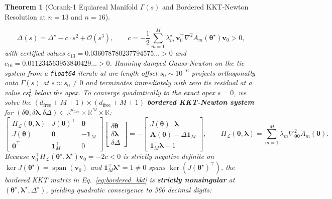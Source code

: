 \documentclass[11pt,a4paper]{article}
\newtheorem{theorem}{Theorem}
\begin{document}
\begin{theorem}[Corank-1 Equiareal Manifold $\Gamma(s)$ and Bordered KKT-Newton Resolution at $n=13$ and $n=16$]
\begin{enumerate}
\begin{equation}
\Delta(s) = \Delta^\star - c \cdot s^2 + \mathcal{O}(s^3), \qquad c = -\frac{1}{2}\sum_{m=1}^M \lambda_m^\star \,\mathbf{v}_0^\top \nabla^2 A_m(\boldsymbol{\theta}^\star)\mathbf{v}_0 > 0,
\tag{18}\label{eq:kkt_curvature}
\end{equation}
with certified values $c_{13} = \mathbf{0.036078780237794575\dots} > 0$ and $c_{16} = \mathbf{0.011234563953840429\dots} > 0$. Running damped Gauss-Newton on the tie system from a \texttt{float64} iterate at arc-length offset $s_0 \sim 10^{-6}$ projects orthogonally onto $\Gamma(s)$ at $s \approx s_0 \ne 0$ and terminates immediately with zero tie residual at a value $c s_0^2$ below the apex. To converge quadratically to the exact apex $s = 0$, we solve the $(d_{\text{free}} + M + 1) \times (d_{\text{free}} + M + 1)$ \textbf{bordered KKT-Newton system} for $(\delta\boldsymbol{\theta}, \delta\boldsymbol{\lambda}, \delta\Delta) \in \mathbb{R}^{d_{\text{free}}} \times \mathbb{R}^M \times \mathbb{R}$:
\begin{equation}
\begin{bmatrix} H_{\mathcal{L}}(\boldsymbol{\theta}, \boldsymbol{\lambda}) & J(\boldsymbol{\theta})^\top & \mathbf{0} \\ J(\boldsymbol{\theta}) & \mathbf{0} & -\mathbf{1}_M \\ \mathbf{0}^\top & \mathbf{1}_M^\top & 0 \end{bmatrix} \begin{bmatrix} \delta\boldsymbol{\theta} \\ \delta\boldsymbol{\lambda} \\ \delta\Delta \end{bmatrix} = -\begin{bmatrix} J(\boldsymbol{\theta})^\top \boldsymbol{\lambda} \\ \mathbf{A}(\boldsymbol{\theta}) - \Delta \mathbf{1}_M \\ \mathbf{1}_M^\top \boldsymbol{\lambda} - 1 \end{bmatrix}, \qquad H_{\mathcal{L}}(\boldsymbol{\theta}, \boldsymbol{\lambda}) = \sum_{m=1}^M \lambda_m \nabla^2_{\boldsymbol{\theta}\boldsymbol{\theta}} A_m(\boldsymbol{\theta}).
\tag{18a}\label{eq:bordered_kkt}
\end{equation}
Because $\mathbf{v}_0^\top H_{\mathcal{L}}(\boldsymbol{\theta}^\star, \boldsymbol{\lambda}^\star) \mathbf{v}_0 = -2c < 0$ is strictly negative definite on $\ker J(\boldsymbol{\theta}^\star) = \operatorname{span}(\mathbf{v}_0)$ and $\mathbf{1}_M^\top \boldsymbol{\lambda}^\star = 1 \ne 0$ spans $\ker(J(\boldsymbol{\theta}^\star)^\top)$, the bordered KKT matrix in Eq.~\eqref{eq:bordered_kkt} is \textbf{strictly nonsingular} at $(\boldsymbol{\theta}^\star, \boldsymbol{\lambda}^\star, \Delta^\star)$, yielding quadratic convergence to 560 decimal digits:

\end{enumerate}
\end{theorem}
\end{document}
